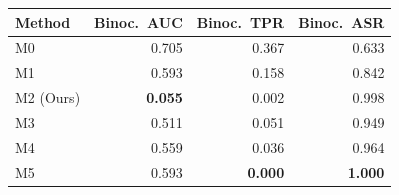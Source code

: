 \begin{tabular}{lrrr}
\toprule
Method & Binoc.\ AUC & Binoc.\ TPR & Binoc.\ ASR \\
\midrule
M0 & 0.705 & 0.367 & 0.633 \\
M1 & 0.593 & 0.158 & 0.842 \\
M2 (Ours) & \textbf{0.055} & 0.002 & 0.998 \\
M3 & 0.511 & 0.051 & 0.949 \\
M4 & 0.559 & 0.036 & 0.964 \\
M5 & 0.593 & \textbf{0.000} & \textbf{1.000} \\
\bottomrule
\end{tabular}

